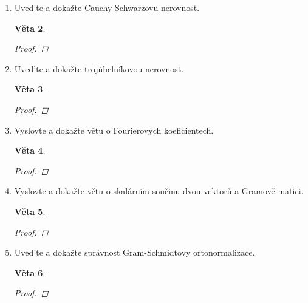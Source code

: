 \documentclass[10pt,a4paper]{article}
\theoremstyle{plain}
\newtheorem{veta}{Věta}
\theoremstyle{definition}
\begin{document}
\begin{enumerate}
\begin{veta}
\begin{proof}

\end{proof}
\end{veta}

\item Uved'te a dokažte Cauchy-Schwarzovu nerovnost.


\begin{veta}

\begin{proof}

\end{proof}
\end{veta}

\item Uved'te a dokažte trojúhelníkovou nerovnost.


\begin{veta}

\begin{proof}

\end{proof}
\end{veta}

\item Vyslovte a dokažte větu o Fourierových koeficientech.


\begin{veta}

\begin{proof}

\end{proof}
\end{veta}

\item Vyslovte a dokažte větu o skalárním součinu dvou vektorů a Gramově matici.


\begin{veta}

\begin{proof}

\end{proof}
\end{veta}

\item Uved'te a dokažte správnost Gram-Schmidtovy ortonormalizace.


\begin{veta}

\begin{proof}

\end{proof}
\end{veta}


\end{enumerate}
\end{document}
